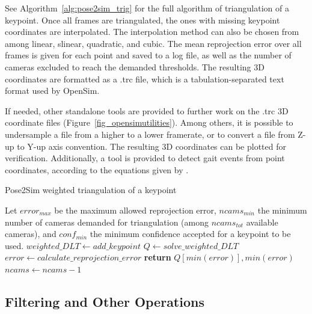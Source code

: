 See Algorithm~\ref{alg:pose2sim_trig} for the full algorithm of triangulation of a keypoint. Once all frames are triangulated, the ones with missing keypoint coordinates are interpolated. The interpolation method can also be chosen from among linear, slinear, quadratic, and cubic. The mean reprojection error over all frames is given for each point and saved to a log file, as well as the number of cameras excluded to reach the demanded thresholds. The resulting 3D coordinates are formatted as a .trc file, which is a tabulation-separated text format used by OpenSim.

If needed, other standalone tools are provided to further work on the .trc 3D coordinate files (Figure~\ref{fig_opensimutilities}). Among others, it is possible to undersample a file from a higher to a lower framerate, or to convert a file from Z-up to Y-up axis convention. The resulting 3D coordinates can be plotted for verification. Additionally, a tool is provided to detect gait events from point coordinates, according to the equations given by \cite{Zeni2008}.


\begin{algorithm}[!ht]
      \caption{Pose2Sim weighted triangulation of a keypoint}\label{alg:pose2sim_trig}
      \begin{algorithmic}[0]
            \STATE Let $error_{max}$ be the maximum allowed reprojection error, $ncams_{min}$ the minimum number of cameras demanded for triangulation (among $ncams_{tot}$ available cameras), and $conf_{min}$ the minimum confidence accepted for a keypoint to be used.
                              \STATE $weighted\_DLT \gets add\_keypoint$
                        \ENDIF
                      \ENDFOR
                    \STATE $Q \gets solve\_weighted\_DLT$
                    \STATE $error \gets calculate\_reprojection\_error$
                \ENDFOR
                    \STATE \textbf{return} $Q[min(error)], min(error)$
                \ELSE 
                    \STATE $ncams \gets ncams-1$
                \ENDIF                
            \ENDWHILE
      \end{algorithmic}
\end{algorithm}


\subsection{Filtering and Other Operations}

